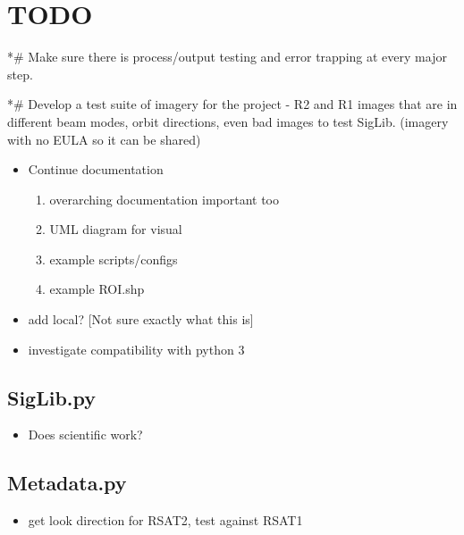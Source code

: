 \documentclass[letterpaper,10pt,openany,oneside]{sphinxmanual}
\begin{document}
\chapter{TODO}
\label{project:todo}
*\# Make sure there is process/output testing and error trapping at
every major step.

*\# Develop a test suite of imagery for the project - R2 and R1 images
that are in different beam modes, orbit directions, even bad images to
test SigLib. (imagery with no EULA so it can be shared)
\begin{itemize}
\item {} 
Continue documentation
\begin{enumerate}
\item {} 
overarching documentation important too

\item {} 
UML diagram for visual

\item {} 
example scripts/configs

\item {} 
example ROI.shp

\end{enumerate}

\item {} 
add local? {[}Not sure exactly what this is{]}

\item {} 
investigate compatibility with python 3

\end{itemize}


\section{SigLib.py}
\label{project:siglib-py}\begin{itemize}
\item {} 
Does scientific work?

\end{itemize}


\section{Metadata.py}
\label{project:metadata-py}\begin{itemize}
\item {} 
get look direction for RSAT2, test against RSAT1

\end{itemize}
\end{document}
